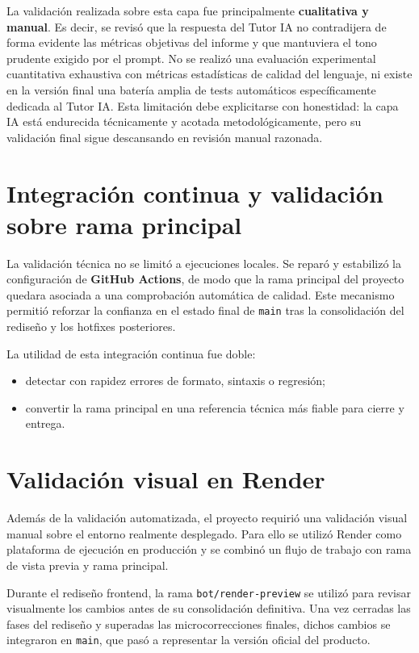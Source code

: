 La validación realizada sobre esta capa fue principalmente \textbf{cualitativa y manual}. Es decir, se revisó que la respuesta del Tutor IA no contradijera de forma evidente las métricas objetivas del informe y que mantuviera el tono prudente exigido por el prompt. No se realizó una evaluación experimental cuantitativa exhaustiva con métricas estadísticas de calidad del lenguaje, ni existe en la versión final una batería amplia de tests automáticos específicamente dedicada al Tutor IA. Esta limitación debe explicitarse con honestidad: la capa IA está endurecida técnicamente y acotada metodológicamente, pero su validación final sigue descansando en revisión manual razonada.

\section{Integración continua y validación sobre rama principal}

La validación técnica no se limitó a ejecuciones locales. Se reparó y estabilizó la configuración de \textbf{GitHub Actions}, de modo que la rama principal del proyecto quedara asociada a una comprobación automática de calidad. Este mecanismo permitió reforzar la confianza en el estado final de \texttt{main} tras la consolidación del rediseño y los hotfixes posteriores.

La utilidad de esta integración continua fue doble:

\begin{itemize}
    \item detectar con rapidez errores de formato, sintaxis o regresión;
    \item convertir la rama principal en una referencia técnica más fiable para cierre y entrega.
\end{itemize}

\section{Validación visual en Render}

Además de la validación automatizada, el proyecto requirió una validación visual manual sobre el entorno realmente desplegado. Para ello se utilizó Render como plataforma de ejecución en producción y se combinó un flujo de trabajo con rama de vista previa y rama principal.

Durante el rediseño frontend, la rama \texttt{bot/render-preview} se utilizó para revisar visualmente los cambios antes de su consolidación definitiva. Una vez cerradas las fases del rediseño y superadas las microcorrecciones finales, dichos cambios se integraron en \texttt{main}, que pasó a representar la versión oficial del producto.

